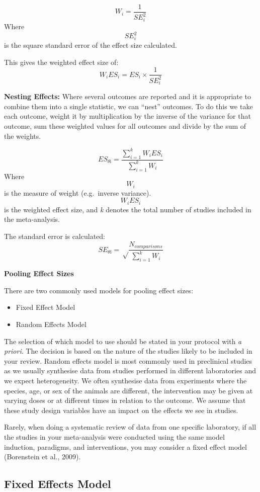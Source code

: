 \documentclass[
]{book}
\providecommand{\tightlist}{%
  \setlength{\itemsep}{0pt}\setlength{\parskip}{0pt}}
\begin{document}
\[W_i = \frac{1}{SE^2_i} \]
Where \[{SE^2_i}\] is the square standard error of the effect size calculated.

This gives the weighted effect size of:
\[W_iES_i = ES_i \times \frac{1}{SE^2_i} \]

\textbf{Nesting Effects:}
Where several outcomes are reported and it is appropriate to combine them into a single statistic, we can ``nest'' outcomes. To do this we take each outcome, weight it by multiplication by the inverse of the variance for that outcome, sum these weighted values for all outcomes and divide by the sum of the weights.

\[ES_{\theta\text{i}} = \frac{\sum_{i=1}^{k} W_iES_i}{\sum_{i=1}^{k} W_i} \]
Where \[W_i\] is the measure of weight (e.g.~inverse variance). \[W_iES_i \] is the weighted effect size, and \emph{k} denotes the total number of studies included in the meta-analysis.

The standard error is calculated:
\[SE_{\theta\text{i}} = \sqrt \frac{N_{comparisons}}{\sum_{i=1}^{k} W_i} \]

\textbf{Pooling Effect Sizes}

There are two commonly used models for pooling effect sizes:

\begin{itemize}
\tightlist
\item
  Fixed Effect Model
\item
  Random Effects Model
\end{itemize}

The selection of which model to use should be stated in your protocol with \emph{a priori}. The decision is based on the nature of the studies likely to be included in your review. Random effects model is most commonly used in preclinical studies as we usually synthesise data from studies performed in different laboratories and we expect heterogeneity. We often synthesise data from experiments where the species, age, or sex of the animals are different, the intervention may be given at varying doses or at different times in relation to the outcome. We assume that these study design variables have an impact on the effects we see in studies.

Rarely, when doing a systematic review of data from one specific laboratory, if all the studies in your meta-analysis were conducted using the same model induction, paradigms, and interventions, you may consider a fixed effect model (Borenstein et al., 2009).

\hypertarget{fixed-effects-model}{%
\subsection{Fixed Effects Model}\label{fixed-effects-model}}
\end{document}

